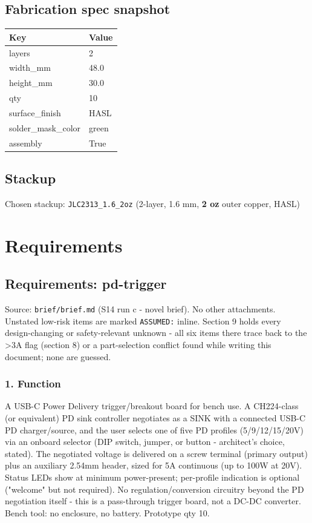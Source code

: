 \documentclass[11pt,a4paper]{article}
\begin{document}
\subsection*{Fabrication spec snapshot}
{\small
\begin{longtable}{ll}
\toprule
\textbf{Key} & \textbf{Value} \\
\midrule
\endhead
layers & 2 \\
width\_mm & 48.0 \\
height\_mm & 30.0 \\
qty & 10 \\
surface\_finish & HASL \\
solder\_mask\_color & green \\
assembly & True \\
\bottomrule
\end{longtable}
}
\subsection*{Stackup}
Chosen stackup: \texttt{JLC2313\_1.6\_2oz} (2-layer, 1.6 mm, \textbf{2 oz} outer copper, HASL)
\section{Requirements}
\subsection*{Requirements: pd-trigger}
Source: \texttt{brief/brief.md} (S14 run c - novel brief). No other attachments. Unstated low-risk items are marked \texttt{ASSUMED:} inline. Section 9 holds every design-changing or safety-relevant unknown - all six items there trace back to the \textgreater{}3A flag (section 8) or a part-selection conflict found while writing this document; none are guessed.

\subsubsection*{1. Function}
A USB-C Power Delivery trigger/breakout board for bench use. A CH224-class (or equivalent) PD sink controller negotiates as a SINK with a connected USB-C PD charger/source, and the user selects one of five PD profiles (5/9/12/15/20V) via an onboard selector (DIP switch, jumper, or button - architect's choice, stated). The negotiated voltage is delivered on a screw terminal (primary output) plus an auxiliary 2.54mm header, sized for 5A continuous (up to 100W at 20V). Status LEDs show at minimum power-present; per-profile indication is optional ("welcome" but not required). No regulation/conversion circuitry beyond the PD negotiation itself - this is a pass-through trigger board, not a DC-DC converter. Bench tool: no enclosure, no battery. Prototype qty 10.
\end{document}
